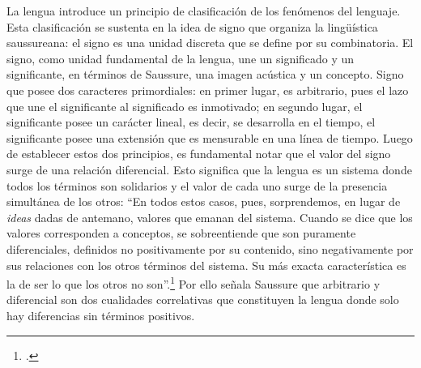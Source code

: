 La lengua introduce un principio de clasificación de los fenómenos del
lenguaje. Esta clasificación se sustenta en la idea de signo que
organiza la lingüística saussureana: el signo es una unidad discreta que
se define por su combinatoria. El signo, como unidad fundamental de la
lengua, une un significado y un significante, en términos de Saussure,
una imagen acústica y un concepto. Signo que posee dos caracteres
primordiales: en primer lugar, es arbitrario, pues el lazo que une el
significante al significado es inmotivado; en segundo lugar, el
significante posee un carácter lineal, es decir, se desarrolla en el
tiempo, el significante posee una extensión que es mensurable en una
línea de tiempo. Luego de establecer estos dos principios, es
fundamental notar que el valor del signo surge de una relación
diferencial. Esto significa que la lengua es un sistema donde todos los
términos son solidarios y el valor de cada uno surge de la presencia
simultánea de los otros: \enquote{En todos estos casos, pues, sorprendemos, en
lugar de \emph{ideas} dadas de antemano, valores que emanan del sistema.
Cuando se dice que los valores corresponden a conceptos, se
sobreentiende que son puramente diferenciales, definidos no
positivamente por su contenido, sino negativamente por sus relaciones
con los otros términos del sistema. Su más exacta característica es la
de ser lo que los otros no son}.\footcite[141]{saussure1945} Por ello señala
Saussure que arbitrario y diferencial son dos cualidades correlativas
que constituyen la lengua donde solo hay diferencias sin términos
positivos.

